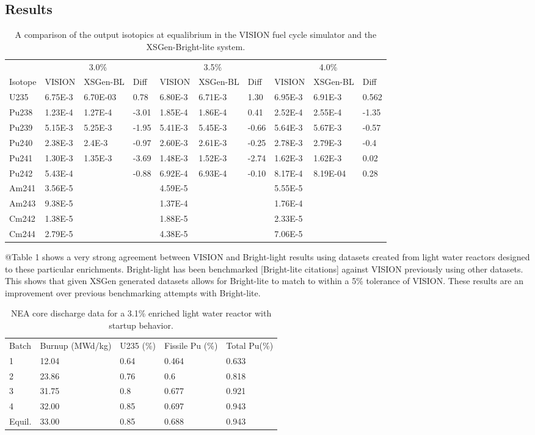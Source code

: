 \documentclass{article}
\begin{document}
\subsection{Results}
\begin{table}[]
\centering
\caption{A comparison of the output isotopics at equalibrium in the VISION fuel cycle simulator and the XSGen-Bright-lite system.}
\label{Table 1}
\begin{tabular}{llllllllll}
 & \multicolumn{3}{c}{3.0\%} & \multicolumn{3}{c}{3.5\%} & \multicolumn{3}{c}{4.0\%} \\
Isotope & VISION & XSGen-BL & Diff & VISION & XSGen-BL & Diff & VISION & XSGen-BL & Diff \\
U235 & 6.75E-3 & 6.70E-03 & 0.78 & 6.80E-3 & 6.71E-3 & 1.30 & 6.95E-3 & 6.91E-3 & 0.562 \\
Pu238 & 1.23E-4 & 1.27E-4 & -3.01 & 1.85E-4 & 1.86E-4 & 0.41 & 2.52E-4 & 2.55E-4 & -1.35 \\
Pu239 & 5.15E-3 & 5.25E-3 & -1.95 & 5.41E-3 & 5.45E-3 & -0.66 & 5.64E-3 & 5.67E-3 & -0.57 \\
Pu240 & 2.38E-3 & 2.4E-3 & -0.97 & 2.60E-3 & 2.61E-3 & -0.25 & 2.78E-3 & 2.79E-3 & -0.4 \\
Pu241 & 1.30E-3 & 1.35E-3 & -3.69 & 1.48E-3 & 1.52E-3 & -2.74 & 1.62E-3 & 1.62E-3 & 0.02 \\
Pu242 & 5.43E-4 &  & -0.88 & 6.92E-4 & 6.93E-4 & -0.10 & 8.17E-4 & 8.19E-04 & 0.28 \\
Am241 & 3.56E-5 &  &  & 4.59E-5 &  &  & 5.55E-5 &  &  \\
Am243 & 9.38E-5 &  &  & 1.37E-4 &  &  & 1.76E-4 &  &  \\
Cm242 & 1.38E-5 &  &  & 1.88E-5 &  &  & 2.33E-5 &  &  \\
Cm244 & 2.79E-5 &  &  & 4.38E-5 &  &  & 7.06E-5 &  & 
\end{tabular}
\end{table}

@Table 1 shows a very strong agreement between VISION and Bright-light results using datasets created from light water reactors designed to these particular enrichments. Bright-light has been benchmarked [Bright-lite citations] against VISION previously using other datasets. This shows that given XSGen generated datasets allows for Bright-lite to match to within a 5\% tolerance of VISION. These results are an improvement over previous benchmarking attempts with Bright-lite. 

\begin{table}[]
\centering
\caption{NEA core discharge data for a 3.1\% enriched light water reactor with startup behavior.}
\label{Table 2}
\begin{tabular}{lllll}
Batch & Burnup (MWd/kg) & U235 (\%) & Fissile Pu (\%) & Total Pu(\%) \\
1 & 12.04 & 0.64 & 0.464 & 0.633 \\
2 & 23.86 & 0.76 & 0.6 & 0.818 \\
3 & 31.75 & 0.8 & 0.677 & 0.921 \\
4 & 32.00 & 0.85 & 0.697 & 0.943 \\
Equil. & 33.00 & 0.85 & 0.688 & 0.943
\end{tabular}
\end{table}
\end{document}
